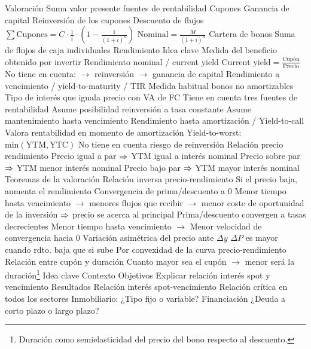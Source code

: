 \documentclass{nuevotema}
\begin{document}
\begin{esquemal}
		\2 Valoración
			\3 Suma valor presente fuentes de rentabilidad
				\4 Cupones
				\4 Ganancia de capital
				\4 Reinversión de los cupones
			\3 Descuento de flujos
				\4 $\sum \text{Cupones} = C \cdot \frac{1}{i} \cdot \left( 1 - \frac{1}{(1+i)^n} \right)$
				\4 $\text{Nominal} = \frac{M}{(1+i)^n}$
			\3 Cartera de bonos
				\4 Suma de flujos de caja individuales
		\2 Rendimiento
			\3 Idea clave
				\4 Medida del beneficio obtenido por invertir
			\3 Rendimiento nominal / current yield
				\4 $\text{Current yield} = \frac{\text{Cupón}}{\text{Precio}}$
				\4 No tiene en cuenta:
				\4[] $\to$ reinversión
				\4[] $\to$ ganancia de capital
			\3 Rendimiento a vencimiento / yield-to-maturity / TIR
				\4 Medida habitual bonos no amortizables
				\4 Tipo de interés que iguala precio con VA de FC
				\4 Tiene en cuenta tres fuentes de rentabilidad
				\4 Asume posibilidad reinversión a tasa constante
				\4 Asume mantenimiento hasta vencimiento
			\3 Rendimiento hasta amortización / Yield-to-call
				\4 Valora rentabilidad en momento de amortización
				\4 Yield-to-worst: $\text{min} \left( \text{YTM}, \text{YTC} \right) $
				\4 No tiene en cuenta riesgo de reinversión
			\3 Relación precio rendimiento
				\4 Precio igual a par $\Rightarrow$ YTM igual a interés nominal
				\4 Precio sobre par $\Rightarrow$ YTM menor interés nominal
				\4 Precio bajo par $\Rightarrow$ YTM mayor interés nominal
		\2 Teoremas de la valoración
			\3 Relación inversa precio-rendimiento
				\4 Si el precio baja, aumenta el rendimiento
			\3 Convergencia de prima/descuento a 0
				\4 Menor tiempo hasta vencimiento
				\4[] $\to$ menores flujos que recibir
				\4[] $\to$ menor coste de oportunidad de la inversión
				\4[] $\Rightarrow$ precio se acerca al principal
			\3 Prima/descuento convergen a tasas decrecientes
				\4 Menor tiempo hasta vencimiento
				\4[] $\to$ Menor velocidad de convergencia hacia 0
			\3 Variación asimétrica del precio ante $\Delta y$
				\4 $\Delta P$ es mayor cuando rdto. baja que si sube
				\4[] Por convexidad de la curva precio-rendimiento
			\3 Relación entre cupón y duración
				\4 Cuanto mayor sea el cupón
				\4[] $\to$ menor será la duración\footnote{Duración como semielasticidad del precio del bono respecto al descuento.}
	\1 
		\2 Idea clave
			\3 Contexto
				\4
			\3 Objetivos
				\4 Explicar relación interés spot y vencimiento
			\3 Resultados
				\4 Relación interés spot-vencimiento
				\4 Relación crítica en todos los sectores
				\4 Inmobiliario:
				\4[] ¿Tipo fijo o variable?
				\4 Financiación
				\4[] ¿Deuda a corto plazo o largo plazo?

\end{esquemal}
\end{document}
